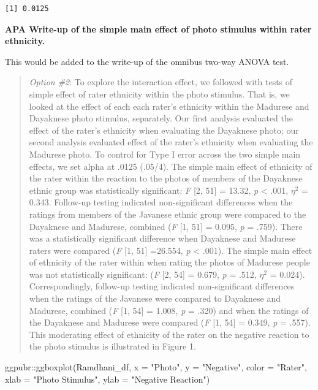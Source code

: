 \documentclass[
  11pt,
]{book}
\newenvironment{Shaded}{\begin{snugshade}}{\end{snugshade}}
\newcommand{\AttributeTok}[1]{\textcolor[rgb]{0.77,0.63,0.00}{#1}}
\newcommand{\FunctionTok}[1]{\textcolor[rgb]{0.00,0.00,0.00}{#1}}
\newcommand{\NormalTok}[1]{#1}
\newcommand{\SpecialCharTok}[1]{\textcolor[rgb]{0.00,0.00,0.00}{#1}}
\newcommand{\StringTok}[1]{\textcolor[rgb]{0.31,0.60,0.02}{#1}}
\begin{document}
\begin{verbatim}
[1] 0.0125
\end{verbatim}

\textbf{APA Write-up of the simple main effect of photo stimulus within rater ethnicity.}

This would be added to the write-up of the omnibus two-way ANOVA test.

\begin{quote}
\emph{Option \#2}: To explore the interaction effect, we followed with tests of simple effect of rater ethnicity within the photo stimulus. That is, we looked at the effect of each each rater's ethnicity within the Madurese and Dayaknese photo stimulus, separately. Our first analysis evaluated the effect of the rater's ethnicity when evaluating the Dayaknese photo; our second analysis evaluated effect of the rater's ethnicity when evaluating the Madurese photo. To control for Type I error across the two simple main effects, we set alpha at .0125 (.05/4). The simple main effect of ethnicity of the rater within the reaction to the photos of members of the Dayaknese ethnic group was statistically significant: \emph{F} {[}2, 51{]} = 13.32, \emph{p} \textless{} .001, \(\eta ^{2}\) = 0.343. Follow-up testing indicated non-significant differences when the ratings from members of the Javanese ethnic group were compared to the Dayaknese and Madurese, combined (\emph{F} {[}1, 51{]} = 0.095, \emph{p} = .759). There was a statistically significant difference when Dayaknese and Madurese raters were compared (\emph{F} {[}1, 51{]} =26.554, \emph{p} \textless{} .001). The simple main effect of ethnicity of the rater within when rating the photos of Madurese people was not statistically significant: (\emph{F} {[}2, 54{]} = 0.679, \emph{p} = .512, \(\eta ^{2}\) = 0.024). Correspondingly, follow-up testing indicated non-significant differences when the ratings of the Javanese were compared to Dayaknese and Madurese, combined (\emph{F} {[}1, 54{]} = 1.008, \emph{p} = .320) and when the ratings of the Dayaknese and Madurese were compared (\emph{F} {[}1, 54{]} = 0.349, \emph{p} = .557). This moderating effect of ethnicity of the rater on the negative reaction to the photo stimulus is illustrated in Figure 1.
\end{quote}

\begin{Shaded}
\begin{Highlighting}[]
\NormalTok{ggpubr}\SpecialCharTok{::}\FunctionTok{ggboxplot}\NormalTok{(Ramdhani\_df, }\AttributeTok{x =} \StringTok{"Photo"}\NormalTok{, }\AttributeTok{y =} \StringTok{"Negative"}\NormalTok{, }\AttributeTok{color =} \StringTok{"Rater"}\NormalTok{,}
    \AttributeTok{xlab =} \StringTok{"Photo Stimulus"}\NormalTok{, }\AttributeTok{ylab =} \StringTok{"Negative Reaction"}\NormalTok{)}
\end{Highlighting}
\end{Shaded}
\end{document}
